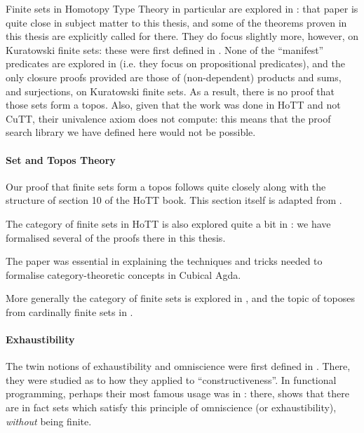 Finite sets in Homotopy Type Theory in particular are explored in
\citet{fruminFiniteSetsHomotopy2018}: that paper is quite close in subject
matter to this thesis, and some of the theorems proven in this thesis are
explicitly called for there.
They do focus slightly more, however, on Kuratowski finite sets: these were
first defined in \citet{kuratowskiNotionEnsembleFini1920}.
None of the ``manifest'' predicates are explored in
\citet{fruminFiniteSetsHomotopy2018} (i.e. they focus on propositional
predicates), and the only closure proofs provided are those of (non-dependent)
products and sums, and surjections, on Kuratowski finite sets.
As a result, there is no proof that those sets form a topos.
Also, given that the work was done in HoTT and not CuTT, their univalence axiom
does not compute: this means that the proof search library we have defined here
would not be possible.
\paragraph{Set and Topos Theory}
Our proof that finite sets form a topos follows quite closely along with the
structure of section 10 of the HoTT book.
This section itself is adapted from \citet{rijkeSetsHomotopyType2015}.

The category of finite sets in HoTT is also explored quite a bit in
\citet{yorgeyCombinatorialSpeciesLabelled2014}: we have formalised several of
the proofs there in this thesis.

The paper \citet{iversenUnivalentCategoriesFormalization2018} was essential in
explaining the techniques and tricks needed to formalise category-theoretic
concepts in Cubical Agda.

More generally the category of finite sets is explored in
\citet{solovevCategoryFiniteSets1983}, and the topic of toposes from cardinally
finite sets in \citet{henryToposesGeneratedCardinal2018}.
\paragraph{Exhaustibility}
The twin notions of exhaustibility and omniscience were first defined in
\citet{bishopFoundationsConstructiveAnalysis1967}.
There, they were studied as to how they applied to ``constructiveness''.
In functional programming, perhaps their most famous usage was in
\citet{escardoInfiniteSetsThat2013}: there,
\citeauthor{escardoInfiniteSetsThat2013} shows that there are in fact sets which
satisfy this principle of omniscience (or exhaustibility), \emph{without} being
finite.
